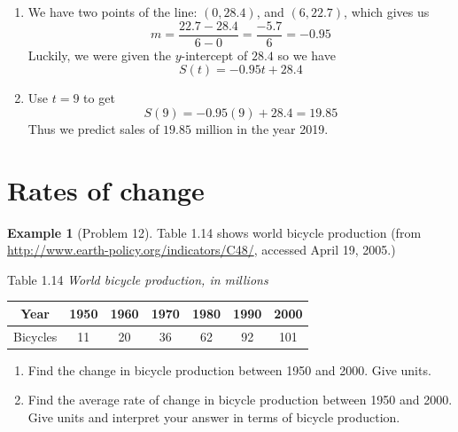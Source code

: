 \documentclass[oneside]{book}
\theoremstyle{definition}
\newtheorem{example}{Example}
\newcommand{\handoutpagebreak}{}
\theoremstyle{solution}
\newtheorem*{solution}{Solution}
\newcommand{\handoutpagebreak}{\newpage}
\newenvironment{solution}{\vspace{2in}\comment}{\endcomment}
\begin{document}
\begin{solution}
  \begin{enumerate}
  \item We have two points of the line: $(0, 28.4)$, and $(6, 22.7)$, which gives us
    $$ 
    m = \frac{22.7-28.4}{6-0} = \frac{-5.7}{6} = -0.95
    $$
    Luckily, we were given the $y$-intercept of $28.4$ so we have
    $$ 
    S(t) = -0.95t + 28.4
    $$
  \item Use $t = 9$ to get
    $$ 
    S(9) = -0.95(9) + 28.4 = 19.85
    $$
    Thus we predict sales of $19.85$ million in the year 2019.
  \end{enumerate}
  \end{solution}

\handoutpagebreak

\section{Rates of change}
\begin{example}[Problem 12]
  Table 1.14 shows world bicycle production (from
  \url{http://www.earth-policy.org/indicators/C48/},
  accessed April 19, 2005.)
\begin{center}
Table 1.14 \emph{World bicycle production, in millions}
\vspace{11pt}

\begin{tabular}{*6{c|}c}
\hline
Year & 1950 & 1960 & 1970 & 1980 & 1990 & 2000 \\ 
\hline
Bicycles & 11 & 20 & 36 & 62 & 92 & 101 \\
\hline
\end{tabular}
\end{center}

\begin{enumerate}
\item  
Find the change in bicycle production between 1950 and 2000. Give units.

\item   
Find the average rate of change in bicycle production between 1950 and
2000. Give units and interpret your answer in terms of bicycle
production.
\end{enumerate}
\end{example}
\end{document}
